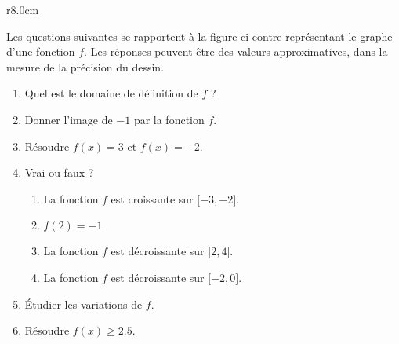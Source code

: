
\begin{exercice}\label{exosmath-0449}

    \begin{wrapfigure}{r}{8.0cm}
        \vspace{-0.5cm}
        \centering
        
    \end{wrapfigure}

    Les questions suivantes se rapportent à la figure ci-contre représentant le graphe d'une fonction \( f\). Les réponses peuvent être des valeurs approximatives, dans la mesure de la précision du dessin.
    \begin{enumerate}
        \item
            Quel est le domaine de définition de \( f\) ?
        \item
            Donner l'image de \( -1\) par la fonction \( f\).
        \item
            Résoudre \( f(x)=3\) et \( f(x)=-2\).
        \item
            Vrai ou faux ?
            \begin{enumerate}
                \item
                    La fonction \( f\) est croissante sur \( \mathopen[ -3 , -2 \mathclose]\).
                \item
                    \( f(2)=-1\)
                \item
                    La fonction \( f\) est décroissante sur \( \mathopen[ 2 , 4 \mathclose]\).
                \item
                    La fonction \( f\) est décroissante sur \( \mathopen[ -2 , 0 \mathclose]\).
            \end{enumerate}
        \item
            Étudier les variations de \( f\).
        \item
            Résoudre \( f(x)\geq 2.5\).
    \end{enumerate}

\end{exercice}
